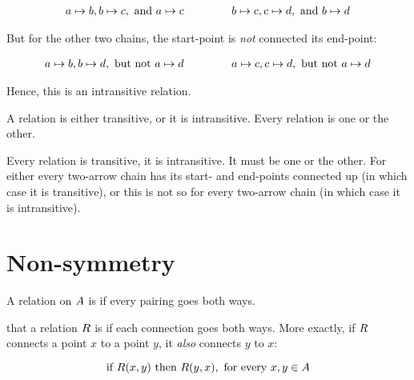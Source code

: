 \documentclass[../../../main.tex]{subfiles}
\begin{document}
\begin{fexample}
\begin{align*}
  a \mapsto b, b \mapsto c, \text{ and } a \mapsto c \hskip 1.5cm 
  b \mapsto c, c \mapsto d, \text{ and } b \mapsto d
\end{align*}

But for the other two chains, the start-point is \emph{not} connected its end-point:

\begin{align*}
  a \mapsto b, b \mapsto d, \text{ but not } a \mapsto d \hskip 1.5cm
  a \mapsto c, c \mapsto d, \text{ but not } a \mapsto d
\end{align*}

Hence, this is an intransitive relation.

\end{fexample}

\begin{aside}
  \begin{remark}
    A relation is either transitive, or it is intransitive. Every relation is one or the other.
  \end{remark}
\end{aside}

Every relation is  transitive,  it is intransitive. It must be one or the other. For either every two-arrow chain has its start- and end-points connected up (in which case it is transitive), or this is not so for every two-arrow chain (in which case it is intransitive).


\section{Non-symmetry}

\begin{terminology}
  A relation on $A$ is  if every pairing goes both ways.
\end{terminology}

 that a relation $R$ is  if each connection goes both ways. More exactly, if $R$ connects a point $x$ to a point $y$, it \emph{also} connects $y$ to $x$:

\begin{equation*}
  \text{ if } R(x, y) \text{ then } R(y, x), \text{ for every $x, y \in A$ }
\end{equation*}
\end{document}
